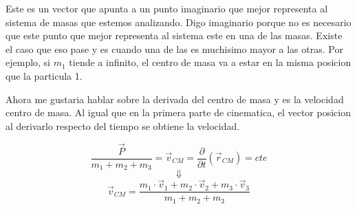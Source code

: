 \documentclass[../Main.tex]{subfiles}
\begin{document}
{     Este es un vector que apunta a un punto imaginario que mejor representa al
     sistema de masas que estemos analizando. Digo imaginario porque no es
     necesario que este punto que mejor representa al sistema este en una de las
     masas. Existe el caso que eso pase y es cuando una de las es muchisimo mayor
     a las otras. Por ejemplo, si $m_1$ tiende a infinito, el centro de masa
     va a estar en la misma posicion que la particula 1.

     Ahora me gustaria hablar sobre la derivada del centro de masa y es la velocidad
     centro de masa. Al igual que en la primera parte de cinematica, el vector
     posicion al derivarlo respecto del tiempo se obtiene la velocidad.

     \begin{equation*}
         \frac{\vec{P}}{m_1 + m_2 + m_3} = \vec{v}_{CM} = \frac{\partial}{\partial t} \left(\vec{r} _{CM}\right) = cte
     \end{equation*}
     \begin{equation*}
         \Downarrow
     \end{equation*}
     \begin{equation}
         \vec{v}_{CM} = \frac{m_1 \cdot \vec{v} _1 + m_2 \cdot \vec{v} _2 + m_3 \cdot \vec{v} _3}{m_1 + m_2 + m_3}
         \label{eq:vc}
     \end{equation}

}
\end{document}
